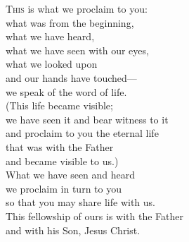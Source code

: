 
\lettrine{T}{his} is what we proclaim to you:\\
what was from the beginning,\\
what we have heard,\\
what we have seen with our eyes,\\
what we looked upon\\
and our hands have touched—\\
we speak of the word of life.\\
(This life became visible;\\
we have seen it and bear witness to it\\
and proclaim to you the eternal life\\
that was with the Father\\
and became visible to us.)\\
What we have seen and heard\\
we proclaim in turn to you\\
so that you may share life with us.\\
This fellowship of ours is with the Father\\
and with his Son, Jesus Christ.
